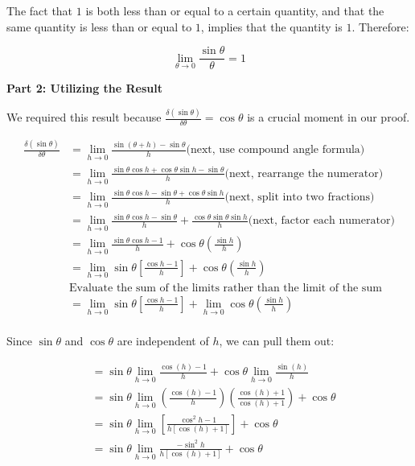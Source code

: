 \documentclass{article}
\begin{document}
The fact that $1$ is both less than or equal to a certain quantity, and that the same quantity is less than or equal to $1$, implies that the quantity is $1$. Therefore:

$$\lim_{\theta \to 0}\frac{\sin \theta}{\theta}=1$$

\textbf{Part 2: Utilizing the Result}

We required this result because $\frac{\delta(\sin \theta)}{\delta \theta}=\cos \theta$ is a crucial moment in our proof.

\begin{align*}
    \frac{\delta (\sin \theta)}{\delta \theta} &= \lim_{h \to 0}\frac{\sin(\theta+h)-\sin \theta}{h} \text{(next, use compound angle formula)}\\
    &=\lim_{h\to 0}\frac{\sin \theta \cos h+\cos \theta \sin h-\sin \theta}{h} \text{(next, rearrange the numerator)}\\
    &= \lim_{h\to 0}\frac{\sin \theta \cos h-\sin \theta +\cos \theta \sin h}{h} \text{(next, split into two fractions)}\\ 
    &=\lim_{h \to 0} \frac{\sin \theta \cos h-\sin \theta }{h}+\frac{\cos \theta \sin \theta \sin h}{h} \text{(next, factor each numerator)}\\
    &=\lim_{h \to 0} \frac{\sin \theta \cos h-1}{h}+\cos \theta \left(\frac{\sin h}{h}\right)\\
    &=\lim_{h \to 0} \sin \theta \left[\frac{\cos h-1}{h}\right]+ \cos \theta \left(\frac{\sin h}{h}\right)\\    
    &\text{Evaluate the sum of the limits rather than the limit of the sum}\\
    &=\lim_{h \to 0} \sin \theta \left[\frac{\cos h-1}{h}\right]+ \lim_{h \to 0}\cos \theta \left(\frac{\sin h}{h}\right)\\    
\end{align*}

Since $\sin \theta$ and $\cos \theta$ are independent of $h$, we can pull them out:

$$
\begin{aligned}
& =\sin \theta \lim _{h \rightarrow 0} \frac{\cos (h)-1}{h}+\cos \theta \lim _{h \rightarrow 0} \frac{\sin (h)}{h} \\
& =\sin \theta \lim _{h \rightarrow 0}\left(\frac{\cos (h)-1}{h}\right)\left(\frac{\cos (h)+1}{\cos (h)+1}\right)+\cos \theta \\
& =\sin \theta \lim _{h \rightarrow 0}\left[\frac{\cos ^2 h-1}{h[\cos (h)+1]}\right]+\cos \theta \\
& =\sin \theta \lim _{h \rightarrow 0} \frac{-\sin ^2 h}{h[\cos (h)+1]}+\cos \theta
\end{aligned}
$$
\end{document}
